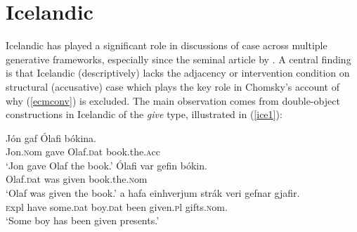 \documentclass[output=paper]{LSP/langsci}
\begin{document}
\section{Icelandic}

Icelandic has played a significant role in discussions of case across multiple generative frameworks, especially since the seminal article by \cite{zmt85}. A central finding is that Icelandic (descriptively) lacks the adjacency or intervention condition on structural (accusative) case which plays the key role in Chomsky's account of why (\ref{ecmconv}) is excluded. The main observation comes from double-object constructions in Icelandic of the \textit{give} type, illustrated in (\ref{ice1}):

\begin{exe}
\ex \label{ice1} \begin{xlista}
\ex \label{bokina}  \gll J\'on gaf \'Olafi b\'okina. \\ 
	Jon.{\textsc nom} gave Olaf.{\textsc dat} book.the.{\textsc acc}\\
	\glt `Jon gave Olaf the book.' \citep[187]{holmplat95}
\ex\label{bokin} \gll \'Olafi var gefin b\'okin. \\
	Olaf.{\textsc dat} was given book.the.{\textsc nom} \\
	\glt `Olaf was given the book.' \citep{falk90}
\ex\label{tec} \gll {\TH}a{\dh} hafa einhverjum str\'ak veri{\dh} gefnar gjafir.\\
	{\textsc expl} have some.{\textsc dat} boy.{\textsc dat} been given.{\textsc pl} gifts.{\textsc nom}. \\
	\glt `Some boy has been given presents.' \citep[99]{holmberg02}
	
\end{xlista}
\end{exe}
\end{document}
